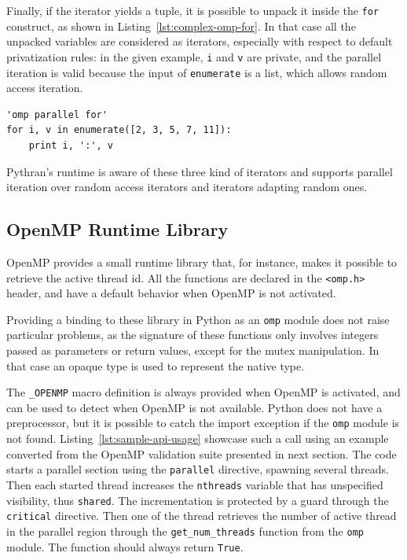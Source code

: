 \documentclass[conference]{IEEEtran}
\begin{document}
Finally, if the iterator yields a tuple, it is possible to unpack it inside the
\texttt{for} construct, as shown in Listing~\ref{lst:complex-omp-for}. In that case
all the unpacked variables are considered as iterators, especially with respect
to default privatization rules: in the given example, \texttt{i} and \texttt{v}
are private, and the parallel iteration is valid because the input of
\texttt{enumerate} is a list, which allows random access iteration.

\begin{lstlisting}[float, label={lst:complex-omp-for}, caption={Parallel
    loop in Pythran with tuple unpacking.}]
'omp parallel for'
for i, v in enumerate([2, 3, 5, 7, 11]):
    print i, ':', v
\end{lstlisting}

Pythran's runtime is aware of these three kind of iterators and supports
parallel iteration over random access iterators and iterators adapting random
ones.

\subsection{OpenMP Runtime Library}

OpenMP provides a small runtime library that, for instance, makes it possible to
retrieve the active thread id. All the functions are declared in the
\texttt{<omp.h>} header, and have a default behavior when OpenMP is not
activated.

Providing a binding to these library in Python as an \texttt{omp} module does
not raise particular problems, as the signature of these functions only involves
integers passed as parameters or return values, except for the mutex
manipulation. In that case an opaque type is used to represent the native type.

The \texttt{\_OPENMP} macro definition is always provided when OpenMP is
activated, and can be used to detect when OpenMP is not available. Python does
not have a preprocessor, but it is possible to catch the import exception if the
\texttt{omp} module is not found. Listing~\ref{lst:sample-api-usage} showcase
such a call using an example converted from the OpenMP validation suite
presented in next section. The code starts a parallel section using the
\texttt{parallel} directive, spawning several threads. Then each started thread
increases the \texttt{nthreads} variable that has unspecified visibility, thus
\texttt{shared}. The incrementation is protected by a guard through the
\texttt{critical} directive. Then one of the thread retrieves the number of
active thread in the parallel region through the \texttt{get\_num\_threads}
function from the \texttt{omp} module. The function should always return
\texttt{True}.
\end{document}
